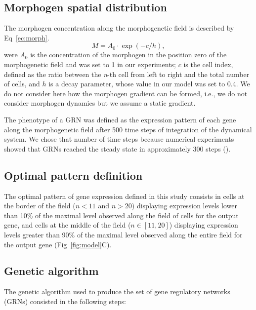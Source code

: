 \documentclass[10pt,letterpaper]{article}
\begin{document}
\subsection*{Morphogen spatial distribution}

The morphogen concentration along the morphogenetic field is described by
Eq~\ref{ec:morph}.
\begin{equation}
 M = A_0 \cdot \exp(-c/h),
 \label{ec:morph}
\end{equation}
\noindent
were $A_0$ is the concentration of the morphogen in the position zero of the
morphogenetic field and was set to 1 in our experiments; $c$ is the cell index,
defined as the ratio between the \emph{n}-th cell from left to right and the
total number of cells, and $h$ is a decay parameter, whose value in our model
was set to 0.4. We do not consider here how the morphogen gradient can be
formed, i.e., we do not consider morphogen dynamics but we assume a static
gradient.

The phenotype of a GRN was defined as the expression pattern of each gene along
the morphogenetic field after 500 time steps of integration of the dynamical
system. We chose that number of time steps because numerical experiments showed
that GRNs reached the steady state in approximately 300 steps ().

\subsection*{Optimal pattern definition}

The optimal pattern of gene expression defined in this study consists in cells at
the border of the field ($n<11$ and $n>20$) displaying expression levels lower than
10\% of the maximal level observed along the field of cells for the output gene,
and cells at the middle of the field ($n ∈ [11,20]$) displaying expression
levels greater than 90\% of the maximal level observed along the entire field
for the output gene (Fig~\ref{fig:model}C).

\subsection*{Genetic algorithm}

The genetic algorithm used to produce the set of gene regulatory networks (GRNs)
consisted in the following steps:
\end{document}
